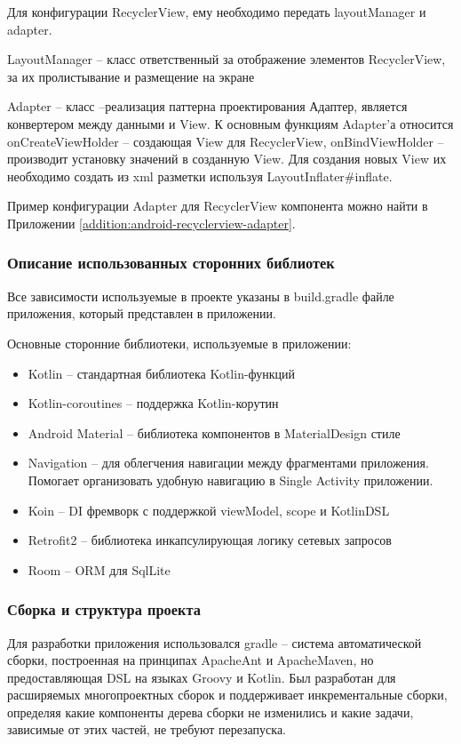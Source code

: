 Для конфигурации RecyclerView, ему необходимо передать layoutManager и adapter.

LayoutManager – класс ответственный за отображение элементов RecyclerView, за их пролистывание и размещение на экране

Adapter – класс –реализация паттерна проектирования Адаптер, является конвертером между данными и View.
К основным функциям Adapter’а относится onCreateViewHolder – создающая View для RecyclerView, onBindViewHolder – производит установку значений в созданную View.
Для создания новых View их необходимо создать из xml разметки используя LayoutInflater\#inflate.

Пример конфигурации Adapter для RecyclerView компонента можно найти в Приложении \ref{addition:android-recyclerview-adapter}.

\subsubsection{Описание использованных сторонних библиотек}\indent
Все зависимости используемые в проекте указаны в build.gradle файле приложения, который представлен в приложении.

Основные сторонние библиотеки, используемые в приложении:
\begin{itemize}
    \item Kotlin – стандартная библиотека Kotlin-функций
    \item Kotlin-coroutines – поддержка Kotlin-корутин
    \item Android Material – библиотека компонентов в MaterialDesign стиле
    \item Navigation – для облегчения навигации между фрагментами приложения. Помогает организовать удобную навигацию в Single Activity приложении.
    \item Koin – DI фремворк с поддержкой viewModel, scope и KotlinDSL
    \item Retrofit2 – библиотека инкапсулирующая логику сетевых запросов
    \item Room – ORM для SqlLite
\end{itemize}

\subsubsection{Сборка и структура проекта}\indent
Для разработки приложения использовался gradle – система автоматической сборки, построенная на принципах ApacheAnt и ApacheMaven, но предоставляющая DSL на языках Groovy и Kotlin.
Был разработан для расширяемых многопроектных сборок и поддерживает инкрементальные сборки, определяя какие компоненты дерева сборки не изменились и какие задачи, зависимые от этих частей, не требуют перезапуска.

